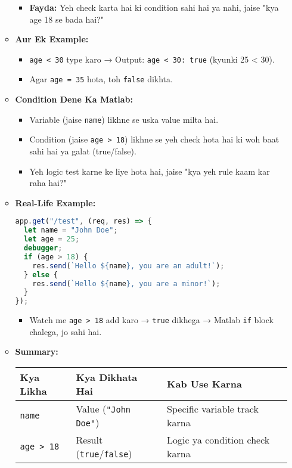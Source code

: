 \documentclass[a4paper,12pt]{article}
\begin{document}
\begin{enumerate}
\begin{itemize}
\begin{itemize}
            \item \textbf{\color{myblue}Fayda:} Yeh check karta hai ki condition sahi hai ya nahi, jaise "kya age 18 se bada hai?"
        \end{itemize}
        \item \textbf{\color{myblue}Aur Ek Example:}  
        \begin{itemize}
            \item \texttt{\color{mygreen}age < 30} type karo → Output: \texttt{\color{mygreen}age < 30: true} (kyunki 25 < 30).
            \item Agar \texttt{\color{mygreen}age = 35} hota, toh \texttt{\color{mygreen}false} dikhta.
        \end{itemize}
        \item \textbf{\color{myblue}Condition Dene Ka Matlab:}  
        \begin{itemize}
            \item Variable (jaise \texttt{\color{mygreen}name}) likhne se uska value milta hai.
            \item Condition (jaise \texttt{\color{mygreen}age > 18}) likhne se yeh check hota hai ki woh baat sahi hai ya galat (true/false).
            \item Yeh logic test karne ke liye hota hai, jaise "kya yeh rule kaam kar raha hai?"
        \end{itemize}
        \item \textbf{\color{myblue}Real-Life Example:}  
        \begin{lstlisting}[language=JavaScript]
app.get("/test", (req, res) => {
  let name = "John Doe";
  let age = 25;
  debugger;
  if (age > 18) {
    res.send(`Hello ${name}, you are an adult!`);
  } else {
    res.send(`Hello ${name}, you are a minor!`);
  }
});
        \end{lstlisting}
        \begin{itemize}
            \item Watch me \texttt{\color{mygreen}age > 18} add karo → \texttt{\color{mygreen}true} dikhega → Matlab \texttt{\color{mygreen}if} block chalega, jo sahi hai.
        \end{itemize}
        \item \textbf{\color{myblue}Summary:}  
        \begin{tabular}{|C{3cm}|C{4cm}|C{5cm}|}
            \hline
             \textbf{\color{myblue}Kya Likha} & \textbf{\color{myblue}Kya Dikhata Hai} & \textbf{\color{myblue}Kab Use Karna} \\
            \hline
            \texttt{\color{mygreen}name} & Value (\texttt{\color{mygreen}"John Doe"}) & Specific variable track karna \\
            \hline
            \texttt{\color{mygreen}age > 18} & Result (\texttt{\color{mygreen}true}/\texttt{\color{mygreen}false}) & Logic ya condition check karna \\
            \hline
        \end{tabular}
    \end{itemize}


\end{enumerate}
\end{document}
